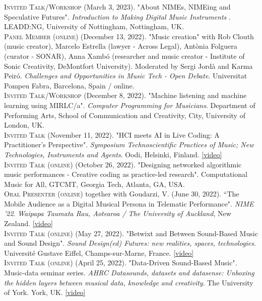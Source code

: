 \documentclass[10pt, a4paper]{article}
\newcommand{\years}[1]{\marginnote{\scriptsize #1}}
\begin{document}
{\years{2023a} \textsc{Invited Talk/Workshop} (March 3, 2023). "About NIMEs, NIMEing and Speculative Futures". \emph{Introduction to Making Digital Music Instruments
}. LEADD:NG, University of Nottingham, Nottingham, UK.\\ 
\years{2022g} \textsc{Panel Member (online)} (December 13, 2022). "Music creation" with Rob Clouth (music creator), Marcelo Estrella (lawyer - Across Legal), Antònia Folguera (curator - SONAR), Anna Xambó (researcher and music creator - Institute of Sonic Creativity, DeMontfort University). Moderated by Sergi Jordà and Karma Peiró. \emph{Challenges and Opportunities in Music Tech - Open Debate}. Universitat Pompeu Fabra, Barcelona, Spain / online.\\ 
\years{2022f} \textsc{Invited Talk/Workshop} (December 8, 2022). "Machine listening and machine learning using MIRLC/a". \emph{Computer Programming for Musicians}. Department of Performing Arts, School of Communication and Creativity, City, University of London, UK.\\ 
\years{2022e} \textsc{Invited Talk} (November 11, 2022). "HCI meets AI in Live Coding: A Practitioner's Perspective". \emph{Symposium Technoscientific
Practices of Music; New Technologies, Instruments and Agents}. Oodi, Helsinki, Finland. \href{https://vimeo.com/779151561}{[video]}\\ 
\years{2022d} \textsc{Invited Talk (online)} (October 26, 2022). "Designing networked algorithmic music performances - Creative coding as practice-led research". Computational Music for All, GTCMT, Georgia Tech, Atlanta, GA, USA.\\ 
\years{2022c} \textsc{Oral Presenter (online)} together with Goudarzi, V. (June 30, 2022). “The Mobile Audience as a Digital Musical Persona in Telematic Performance". \emph{NIME '22}. \emph{Waipapa Taumata Rau, Aotearoa / The University of Auckland}, New Zealand. \href{https://youtu.be/xu5ySfbqYs8}{[video]}\\
\years{2022b} \textsc{Invited Talk (online)} (May 27, 2022). "Betwixt and Between Sound-Based Music and Sound Design". \emph{Sound Design(ed) Futures: new realities, spaces, technologies}. Université Gustave Eiffel, Champs-sur-Marne, France. \href{https://clap.univ-eiffel.fr/channels/#ccaman-journee-detude-internationale-sound-designed-futures-new-realities-spaces-technologies}{[video]}\\ 
\years{2022a} \textsc{Invited Talk (online)} (April 25, 2022). "Data-Driven Sound-Based Music". Music-data seminar series. \emph{AHRC Datasounds, datasets and datasense: Unboxing the hidden layers between musical data, knowledge and creativity}. The University of York. York, UK. \href{https://youtu.be/8ootXx1csJQ}{[video]}\\ 
}
\end{document}
